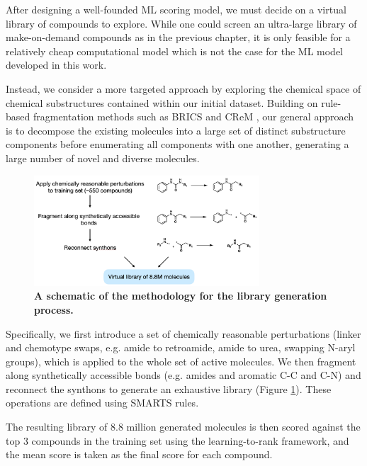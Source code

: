 After designing a well-founded ML scoring model, we must decide on a virtual library of compounds to explore. While one could screen an ultra-large library of make-on-demand compounds as in the previous chapter, it is only feasible for a relatively cheap computational model which is not the case for the ML model developed in this work. 

Instead, we consider a more targeted approach by exploring the chemical space of chemical substructures contained within our initial dataset. Building on rule-based fragmentation methods such as BRICS \cite{Degen2008brics} and CReM \cite{Polishchuk2020Crem}, our general approach is to decompose the existing molecules into a large set of distinct substructure components before enumerating all components with one another, generating a large number of novel and diverse molecules.

\begin{figure}[!th]
 \centering
 \includegraphics[width=0.75\textwidth]{Chapters/Ranking/Figs/library.png}
 \caption{\textbf{A schematic of the methodology for the library generation process.}}
 \label{fig:library}
\end{figure}

Specifically, we first introduce a set of chemically reasonable perturbations (linker and chemotype swaps, e.g. amide to retroamide, amide to urea, swapping N-aryl groups), which is applied to the whole set of active molecules. We then fragment along synthetically accessible bonds (e.g. amides and aromatic C-C and C-N) and reconnect the synthons to generate an exhaustive library (Figure \ref{fig:library}). These operations are defined using SMARTS rules.

The resulting library of 8.8 million generated molecules is then scored against the top 3 compounds in the training set using the learning-to-rank framework, and the mean score is taken as the final score for each compound.

